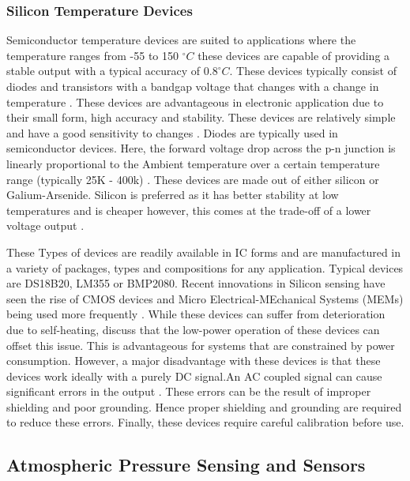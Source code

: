 \subsubsection{Silicon Temperature Devices}

Semiconductor temperature devices are suited to applications where the temperature ranges from -55 to 150 $^\circ C$ these devices are capable of providing a stable output with a typical accuracy of $0.8 ^\circ C$. These devices typically consist of diodes and transistors with a bandgap voltage that changes with a change in temperature \cite{childs2000review}. These devices are advantageous in electronic application due to their small form, high accuracy and stability. These devices are relatively simple and have a good sensitivity to changes \cite{childs2000review}. Diodes are typically used in semiconductor devices. Here, the forward voltage drop across the p-n junction is linearly proportional to the Ambient temperature over a certain temperature range (typically 25K - 400k) \cite{childs2000review}. These devices are made out of either silicon or Galium-Arsenide. Silicon is preferred as it has better stability at low temperatures and is cheaper however, this comes at the trade-off of a lower voltage output \cite{childs2000review}. \par These Types of devices are readily available in IC forms and are manufactured in a variety of packages, types and compositions for any application. Typical devices are DS18B20, LM355 or BMP2080. Recent innovations in Silicon sensing have seen the rise of CMOS devices and Micro Electrical-MEchanical Systems (MEMs) being used more frequently \cite{mansoor2015silicon}. While these devices can suffer from deterioration due to self-heating, \textcite{mansoor2015silicon} discuss that the low-power operation of these devices can offset this issue. This is advantageous for systems that are constrained by power consumption. However, a major disadvantage with these devices is that these devices work ideally with a purely DC signal.An AC coupled signal can cause significant errors in the output \cite{childs2000review} \cite{mansoor2015silicon}. These errors can be the result of improper shielding and poor grounding. Hence proper shielding and grounding are required to reduce these errors. Finally, these devices require careful calibration before use.

\subsection{Atmospheric Pressure Sensing and Sensors}

